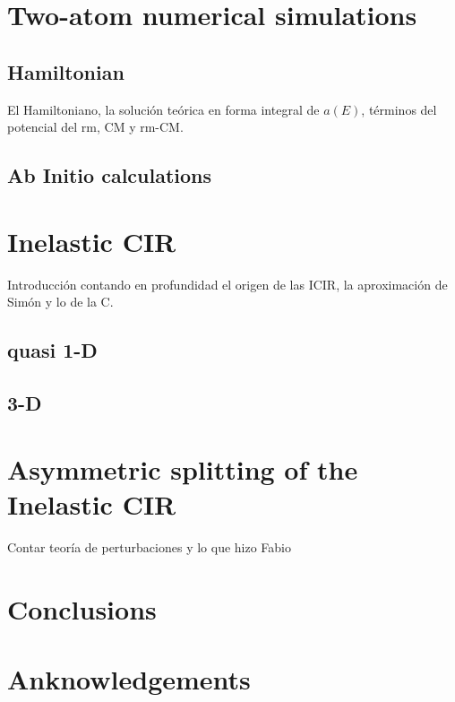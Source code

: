 \documentclass[aps,pre,twocolumn,superscriptaddress,showpacs]{revtex4-1}
\begin{document}
\section{Two-atom numerical simulations}  \label{sec:system}
\subsection{Hamiltonian}
El Hamiltoniano, la solución teórica en forma integral de $a(E)$, términos del potencial del rm, CM y rm-CM.

\subsection{Ab Initio calculations}
\section{Inelastic CIR}  \label{sec:theory}
Introducción contando en profundidad el origen de las ICIR, la aproximación de Simón y lo de la C.

\subsection{quasi 1-D}

\subsection{3-D}
\section{Asymmetric splitting of the Inelastic CIR} \label{sec:perturbation}
Contar teoría de perturbaciones y lo que hizo Fabio

\section{Conclusions}
\section*{Anknowledgements}
\end{document}
